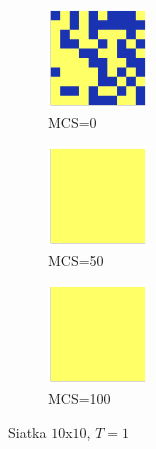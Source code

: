 \documentclass[12pt]{article}
\begin{document}
\begin{figure}[H]
  \centering

  \begin{subfigure}[b]{0.3\linewidth}
    \centering
    \includegraphics[width=100px, height=100px]{../data/snaps/snap10_temp1.0_moment1.png}
    \caption{MCS=0}
    \label{fig:image1}
  \end{subfigure}
  \hfill
  \begin{subfigure}[b]{0.3\linewidth}
    \centering
    \includegraphics[width=100px, height=100px]{../data/snaps/snap10_temp1.0_moment50.png}
    \caption{MCS=50}
    \label{fig:image2}
  \end{subfigure}
  \hfill
  \begin{subfigure}[b]{0.3\linewidth}
    \centering
    \includegraphics[width=100px, height=100px]{../data/snaps/snap10_temp1.0_moment100.png}
    \caption{MCS=100}
    \label{fig:image3}
  \end{subfigure}

  \caption{Siatka $10$x$10$, $T=1$}
  \label{fig:series}
\end{figure}
\end{document}
